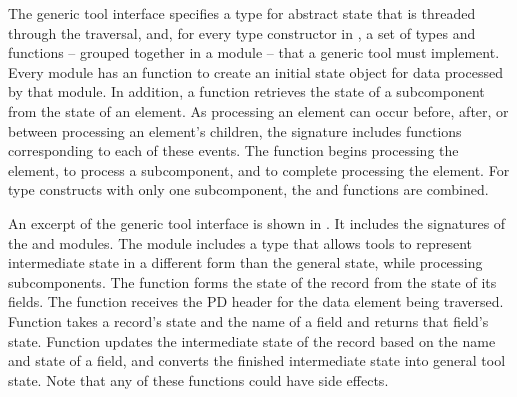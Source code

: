 The generic tool interface specifies a type for abstract state that is
threaded through the traversal, and, for every type constructor in
\padsml{}, a set of types and functions -- grouped together in a
module -- that a generic tool must implement. Every module has an
 function to create an initial state object for data
processed by that module. In addition, a  function
retrieves the state of a subcomponent from the state of an element. As
processing an element can occur before, after, or between processing
an element's children, the signature includes functions corresponding
to each of these events. The function  begins processing the
element,  to process a subcomponent, and 
to complete processing the element. For type constructs with only one
subcomponent, the  and  functions are combined.


An excerpt of the generic tool interface is shown in
. It includes the signatures of the
 and  modules. The  module includes
a type  that allows tools to represent intermediate
state in a different form than the general state, while processing
subcomponents. The  function forms the state of the record
from the state of its fields. The  function receives the PD
header for the data element being traversed. Function 
takes a record's state and the name of a field and returns that
field's state. Function  updates the intermediate
state of the record based on the name and state of a field, and
 converts the finished intermediate state into general tool
state.  Note that any of these functions could have side effects.

